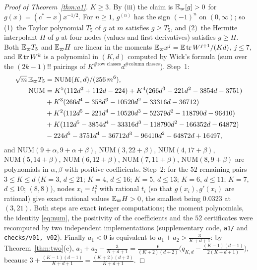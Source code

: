\begin{proof}[Proof of Theorem~\ref{thm:a1}]
\emph{$K\ge3$.} By (iii) the claim is $\mathbb{E}_\varpi[g]>0$ for $g(x)=(c^\ast-x)x^{-1/2}$. For $n\ge1$, $g^{(n)}$ has the sign
$(-1)^n$ on $(0,\infty)$; so (1)~the Taylor polynomial $T_5$ of $g$ at $m$ satisfies $g\ge T_5$, and (2)~the Hermite
interpolant $H$ of $g$ at four nodes (values and first derivatives) satisfies $g\ge H$. Both $\mathbb{E}_\varpi T_5$ and $\mathbb{E}_\varpi H$
are linear in the moments $\mathbb{E}_\varpi x^j=\mathbb{E}\operatorname{tr} W^{j+1}/(Kd)$, $j\le7$, and $\mathbb{E}\operatorname{tr} W^k$ is a polynomial in $(K,d)$ computed by
Wick's formula (sum over the $(2k-1)!!$ pairings of $K^{\#\text{row classes}}d^{\#\text{column classes}}$). Step~1:
\begin{equation}\label{eq:num}
\begin{aligned}
\sqrt m\,\mathbb{E}_\varpi T_5&=\mathrm{NUM}(K,d)/(256\,m^6),\\
\mathrm{NUM}&=K^5(112d^2+112d-224)+K^4(266d^3-221d^2-3854d-3751)\\
&+K^3(266d^4-358d^3-10520d^2-33316d-36712)\\
&+K^2(112d^5-221d^4-10520d^3-52379d^2-118790d-96410)\\
&+K(112d^5-3854d^4-33316d^3-118790d^2-166352d-64872)\\
&-224d^5-3751d^4-36712d^3-96410d^2-64872d+16497,
\end{aligned}
\end{equation}
and $\mathrm{NUM}(9+\alpha,9+\alpha+\beta)$, $\mathrm{NUM}(3,22+\beta)$, $\mathrm{NUM}(4,17+\beta)$, $\mathrm{NUM}(5,14+\beta)$,
$\mathrm{NUM}(6,12+\beta)$, $\mathrm{NUM}(7,11+\beta)$, $\mathrm{NUM}(8,9+\beta)$ are polynomials in $\alpha,\beta$ with
positive coefficients. Step~2: for the $52$ remaining pairs $3\le K\le d$ ($K=3$, $d\le21$; $K=4$, $d\le16$; $K=5$,
$d\le13$; $K=6$, $d\le11$; $K=7$, $d\le10$; $(8,8)$), nodes $x_i=t_i^2$ with rational $t_i$ (so that $g(x_i),g'(x_i)$
are rational) give exact rational values $\mathbb{E}_\varpi H>0$, the smallest being $0.0323$ at $(3,21)$. Both steps are exact
integer computations; the moment polynomials, the identity \eqref{eq:num}, the positivity of the coefficients and the
$52$ certificates were recomputed by two independent implementations (supplementary code, \texttt{a1/} and \texttt{checks/v01, v02}).
Finally $a_1<0$ is equivalent to $a_1+a_2>\frac3{K+d+1}$: by Theorem~\ref{thm:two}(c),
$a_1+a_2-\frac3{K+d+1}=\frac{6}{(K+2)(d+2)}\big(q_{K,d}-\frac{(K-1)(d-1)}{2(K+d+1)}\big)$, because
$3+\frac{(K-1)(d-1)}{K+d+1}=\frac{(K+2)(d+2)}{K+d+1}$.
\end{proof}
